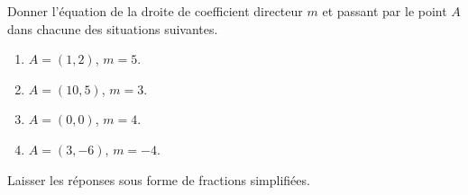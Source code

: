 
\begin{exercice}\label{exosmath-0414}

    Donner l'équation de la droite de coefficient directeur \( m\) et passant par le point \( A\) dans chacune des situations suivantes.
    \begin{enumerate}
        \item
            \( A=(1,2)\), \( m=5\).
        \item
            \( A=(10,5)\), \( m=3\).
        \item
            \( A=(0,0)\), \( m=4\).
        \item
            \( A=(3,-6)\), \( m=-4\).
    \end{enumerate}
    Laisser les réponses sous forme de fractions simplifiées.

\end{exercice}
